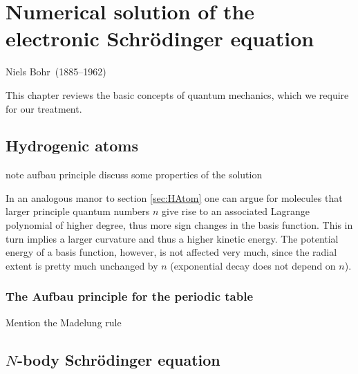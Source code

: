 \chapter{Numerical solution of the electronic Schrödinger equation}
\label{ch:qchem}
{Niels Bohr~(1885--1962)} \\

This chapter reviews the basic concepts of quantum mechanics,
which we require for our treatment.



\section{Hydrogenic atoms}
\label{sec:HAtom}



note aufbau principle
discuss some properties of the solution


In an analogous manor to section \vref{sec:HAtom}
one can argue for molecules that larger principle quantum numbers
$n$ give rise to an associated Lagrange polynomial of higher degree,
thus more sign changes in the basis function.
This in turn implies a larger curvature and thus a higher kinetic energy.
The potential energy of a basis function, however,
is not affected very much,
since the radial extent is pretty much unchanged by $n$
(exponential decay does not depend on $n$).

\subsection{The Aufbau principle for the periodic table}
\label{sec:PSEAufbau}
Mention the Madelung rule

\section{$N$-body Schrödinger equation}

